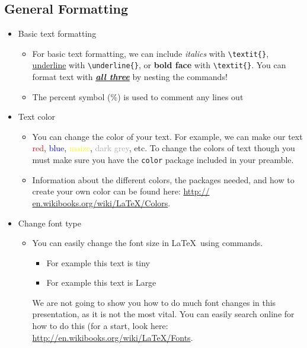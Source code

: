 \documentclass[]{article}%
\newcommand{\bs}{\textbackslash}
\newcommand{\TT}[1]{\texttt{#1}}
\newcommand{\tpc}{\textperiodcentered}
\theoremstyle{definition}
\begin{document}
\subsection{General Formatting}
\begin{itemize}
	\item Basic text formatting
	\begin{itemize}
		\item For basic text formatting, we can include \textit{italics} with \TT{\bs textit\{\tpc\}}, \underline{underline} with \TT{\bs underline\{\tpc\}}, or \textbf{bold face} with \TT{\bs textit\{\tpc\}}.
		You can format text with \textit{\underline{\textbf{all three}}} by nesting the commands!
		\item The percent symbol (\%) is used to comment any lines out
	\end{itemize}
	\item Text color
	\begin{itemize}
		\item You can change the color of your text.
		For example, we can make our text \textcolor{red}{red}, \textcolor{blue}{blue}, \textcolor{yellow}{maize}, \textcolor{darkgrey}{dark grey}, etc.
		To change the colors of text though you must make sure you have the \TT{color} package included in your preamble.
		\item Information about the different colors, the packages needed, and how to create your own color can be found here: \url{http://	en.wikibooks.org/wiki/LaTeX/Colors}.
	\end{itemize}
	\item Change font type
	\begin{itemize}
		\item You can easily change the font size in \LaTeX\ using commands.
		\begin{itemize}
			\item \tiny For example this text is tiny
			\item \LARGE For example this text is Large
		\end{itemize}
		We are not going to show you how to do much font changes in this presentation, as it is not the most vital.
		You can easily search online for how to do this (for a start, look here: \url{http://en.wikibooks.org/wiki/LaTeX/Fonts}.

\end{itemize}
\end{itemize}
\end{document}
